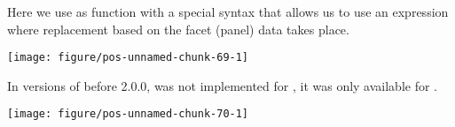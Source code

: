 \documentclass[paper=a4,10pt,div=17,headsepline,BCOR=12mm,twoside,open=right]{scrbook}\usepackage{knitr}
\begin{document}
\begin{knitrout}\footnotesize
{}\color{fgcolor}\begin{kframe}
\begin{alltt}
\hlopt{$} \hlkwb{<-} \hlopt{$}
                        \hlstd{=} \hlstd{(}\hlstd{,} \hlstd{,} \hlstd{))}
 \hlkwb{<-} \hlstd{(}   \hlopt{+}
      \hlstd{()} \hlopt{+}
       \hlopt{~}   
\end{alltt}
\end{kframe}
\end{knitrout}

Here we use as  function  with a special syntax that allows us to use an expression where replacement based on the facet (panel) data takes place.

\begin{knitrout}\footnotesize
{}\color{fgcolor}\begin{kframe}
\begin{alltt}
 \hlopt{+}  \hlopt{~}   \hlstd{=}  \hlopt{^} 
\end{alltt}
\end{kframe}

{\centering \texttt{[image: figure/pos-unnamed-chunk-69-1]} 

}



\end{knitrout}

In versions of  before 2.0.0,  was not implemented for , it was only available for .

\begin{knitrout}\footnotesize
{}\color{fgcolor}\begin{kframe}
\begin{alltt}
 \hlopt{+} \hlstd{(}\hlopt{~}   \hlstd{=}  \hlopt{^} 
\end{alltt}
\end{kframe}

{\centering \texttt{[image: figure/pos-unnamed-chunk-70-1]} 

}



\end{knitrout}
\end{document}

